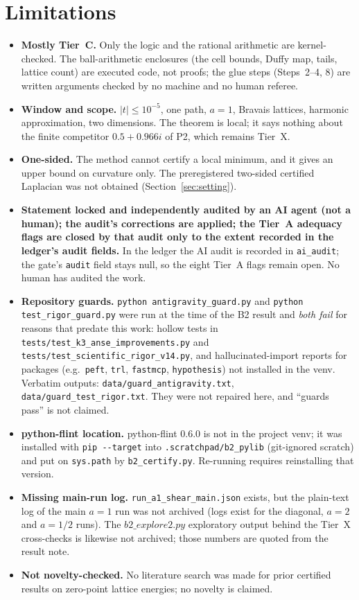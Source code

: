 \documentclass[10pt]{article}
\begin{document}
\section{Limitations}\label{sec:lim}
\begin{itemize}\itemsep=1pt
\item \textbf{Mostly Tier~C.} Only the logic and the rational arithmetic are kernel-checked. The ball-arithmetic enclosures (the cell bounds, Duffy map, tails, lattice count) are executed code, not proofs; the glue steps (Steps~2--4, 8) are written arguments checked by no machine and no human referee.
\item \textbf{Window and scope.} $|t|\le10^{-5}$, one path, $a=1$, Bravais lattices, harmonic approximation, two dimensions. The theorem is local; it says nothing about the finite competitor $0.5+0.966i$ of P2, which remains Tier~X.
\item \textbf{One-sided.} The method cannot certify a local minimum, and it gives an upper bound on curvature only. The preregistered two-sided certified Laplacian was not obtained (Section~\ref{sec:setting}).
\item \textbf{Statement locked and independently audited by an AI agent (not a human); the audit's corrections are applied; the Tier~A adequacy flags are closed by that audit only to the extent recorded in the ledger's audit fields.} In the ledger the AI audit is recorded in \texttt{ai\_audit}; the gate's \texttt{audit} field stays null, so the eight Tier~A flags remain open. No human has audited the work.
\item \textbf{Repository guards.} \texttt{python antigravity\_guard.py} and \texttt{python test\_rigor\_guard.py} were run at the time of the B2 result and \emph{both fail} for reasons that predate this work: hollow tests in \texttt{tests/test\_k3\_anse\_improvements.py} and \texttt{tests/test\_scientific\_rigor\_v14.py}, and hallucinated-import reports for packages (e.g.\ \texttt{peft}, \texttt{trl}, \texttt{fastmcp}, \texttt{hypothesis}) not installed in the venv. Verbatim outputs: \texttt{data/guard\_antigravity.txt}, \texttt{data/guard\_test\_rigor.txt}. They were not repaired here, and ``guards pass'' is not claimed.
\item \textbf{python-flint location.} python-flint 0.6.0 is not in the project venv; it was installed with \texttt{pip -{}-target} into \texttt{.scratchpad/b2\_pylib} (git-ignored scratch) and put on \texttt{sys.path} by \texttt{b2\_certify.py}. Re-running requires reinstalling that version.
\item \textbf{Missing main-run log.} \texttt{run\_a1\_shear\_main.json} exists, but the plain-text log of the main $a=1$ run was not archived (logs exist for the diagonal, $a=2$ and $a=1/2$ runs). The $b2\_explore2.py$ exploratory output behind the Tier~X cross-checks is likewise not archived; those numbers are quoted from the result note.
\item \textbf{Not novelty-checked.} No literature search was made for prior certified results on zero-point lattice energies; no novelty is claimed.
\end{itemize}
\end{document}
